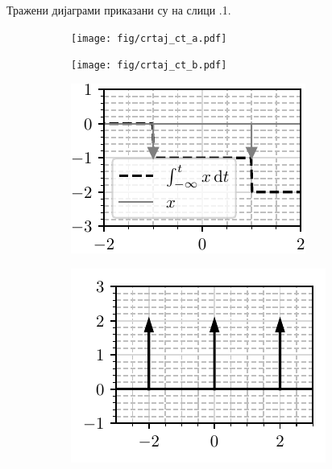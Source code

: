 \REZULTAT  
Тражени дијаграми приказани су 
на слици \ID.1. \\
\begin{figure}[ht!]
    \hspace*{0pt}\hfill
    \begin{subfigure}[c]{0.45\textwidth}
        \centering
        \texttt{[image: fig/crtaj\_ct\_a.pdf]}
        \caption{}
    \end{subfigure}
    \hspace*{0pt}\hfill
    \begin{subfigure}[c]{0.45\textwidth}
        \centering
        \texttt{[image: fig/crtaj\_ct\_b.pdf]}
        \caption{}
    \end{subfigure}
    \hfill
    \hspace*{0pt}

    \hspace*{0pt}\hfill
    \begin{subfigure}[c]{0.45\textwidth}
        \centering
        \includegraphics[scale=1]{fig/crtaj_ct_v.pdf}
        \caption{}
    \end{subfigure}
    \hspace*{0pt}\hfill
    \begin{subfigure}[c]{0.45\textwidth}
        \centering
        \includegraphics[scale=1]{fig/crtaj_ct_g.pdf}
        \caption{}
    \end{subfigure}
    \hfill
    \hspace*{0pt}

    \caption{}
\end{figure}